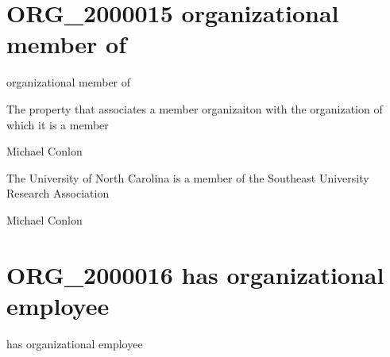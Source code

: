 \documentclass[letterpaper,10pt,english]{sphinxmanual}
\begin{document}
\section{ORG\_2000015 \sphinxhyphen{} organizational member of}
\label{\detokenize{doc-ORG_2000015:org-2000015-organizational-member-of}}\label{\detokenize{doc-ORG_2000015:index-0}}\label{\detokenize{doc-ORG_2000015::doc}}
\begin{sphinxShadowBox}

\sphinxAtStartPar
organizational member of
\end{sphinxShadowBox}

\begin{sphinxShadowBox}

\sphinxAtStartPar
The property that associates a member organizaiton with the organization of which it is a member
\end{sphinxShadowBox}

\begin{sphinxShadowBox}

\sphinxAtStartPar
Michael Conlon 
\end{sphinxShadowBox}

\begin{sphinxShadowBox}

\sphinxAtStartPar
The University of North Carolina is a member of the Southeast University Research Association
\end{sphinxShadowBox}

\begin{sphinxShadowBox}

\sphinxAtStartPar
Michael Conlon 
\end{sphinxShadowBox}
\begin{quote}
\label{\detokenize{doc-ORG_2000016:org-2000016}}\label{\detokenize{doc-ORG_2000016:has-organizational-employee}}\label{\detokenize{doc-ORG_2000016:org-2000016}}
\ignorespaces \end{quote}


\section{ORG\_2000016 \sphinxhyphen{} has organizational employee}
\label{\detokenize{doc-ORG_2000016:org-2000016-has-organizational-employee}}\label{\detokenize{doc-ORG_2000016:index-0}}\label{\detokenize{doc-ORG_2000016::doc}}
\begin{sphinxShadowBox}

\sphinxAtStartPar
has organizational employee
\end{sphinxShadowBox}
\end{document}
